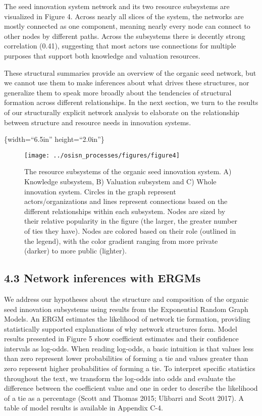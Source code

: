 \documentclass[twoside,12pt,final]{ucthesis-CA2012}
\begin{document}
\begin{ucmainmatter}
The seed innovation system network and its two resource subsystems are
visualized in Figure 4. Across nearly all \textquotesingle slices\textquotesingle{} of the system, the
networks are mostly connected as one component, meaning nearly every
node can connect to other nodes by different \textquotesingle paths\textquotesingle. Across the
subsystems there is decently strong correlation (0.41), suggesting that
most actors use connections for multiple purposes that support both
knowledge and valuation resources.

These structural summaries provide an overview of the organic seed
network, but we cannot use them to make inferences about what drives
these structures, nor generalize them to speak more broadly about the
tendencies of structural formation across different relationships. In
the next section, we turn to the results of our structurally explicit
network analysis to elaborate on the relationship between structure and
resource needs in innovation systems.

\{width=``6.5in'' height=``2.0in''\}
\begin{figure}

{\centering \texttt{[image: ../osisn\_processes/figures/figure4]} 

}

\caption{The resource subsystems of the organic seed innovation system. A) Knowledge subsystem, B) Valuation subsystem and C) Whole innovation system. Circles in the graph represent actors/organizations and lines represent connections based on the different relationships within each subsystem. Nodes are sized by their relative popularity in the figure (the larger, the greater number of ties they have). Nodes are colored based on their role (outlined in the legend), with the color gradient ranging from more private (darker) to more public (lighter).  }\label{fig:unnamed-chunk-20}
\end{figure}
\hypertarget{network-inferences-with-ergms}{%
\subsection{4.3 Network inferences with ERGMs}\label{network-inferences-with-ergms}}

We address our hypotheses about the structure and composition of the
organic seed innovation subsystems using results from the Exponential
Random Graph Models. An ERGM estimates the likelihood of network tie
formation, providing statistically supported explanations of why network
structures form. Model results presented in Figure 5 show coefficient
estimates and their confidence intervals as log-odds. When reading
log-odds, a basic intuition is that values less than zero represent
lower probabilities of forming a tie and values greater than zero
represent higher probabilities of forming a tie. To interpret specific
statistics throughout the text, we transform the log-odds into odds and
evaluate the difference between the coefficient value and one in order
to describe the likelihood of a tie as a percentage (Scott and Thomas
2015; Ulibarri and Scott 2017). A table of model results is available in
Appendix C-4.


\end{ucmainmatter}
\end{document}
